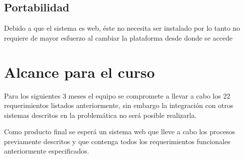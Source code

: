\subsection{Portabilidad}
Debido a que el sistema es web, éste no necesita ser instalado por lo tanto no requiere de mayor esfuerzo al cambiar la plataforma desde donde se accede
\section{Alcance para el curso}

Para los siguientes 3 meses el equipo se compromete a llevar a cabo los 22 requerimientos listados anteriormente, sin embargo la integración con otros sistemas descritos en la problemática no será posible realizarla. 

Como producto final se esperá un sistema web que lleve a cabo los procesos previamente descritos y que contenga todos los requerimientos funcionales anteriormente especificados.


